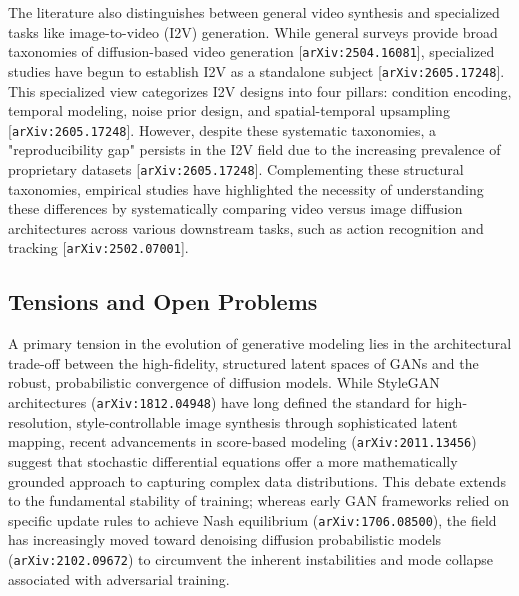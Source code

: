 \documentclass[11pt]{article}
\begin{document}
The literature also distinguishes between general video synthesis and specialized tasks like image-to-video (I2V) generation. While general surveys provide broad taxonomies of diffusion-based video generation [\texttt{arXiv:2504.16081}], specialized studies have begun to establish I2V as a standalone subject [\texttt{arXiv:2605.17248}]. This specialized view categorizes I2V designs into four pillars: condition encoding, temporal modeling, noise prior design, and spatial-temporal upsampling [\texttt{arXiv:2605.17248}]. However, despite these systematic taxonomies, a "reproducibility gap" persists in the I2V field due to the increasing prevalence of proprietary datasets [\texttt{arXiv:2605.17248}]. Complementing these structural taxonomies, empirical studies have highlighted the necessity of understanding these differences by systematically comparing video versus image diffusion architectures across various downstream tasks, such as action recognition and tracking [\texttt{arXiv:2502.07001}].

\subsection{Tensions and Open Problems}

A primary tension in the evolution of generative modeling lies in the architectural trade-off between the high-fidelity, structured latent spaces of GANs and the robust, probabilistic convergence of diffusion models. While StyleGAN architectures (\texttt{arXiv:1812.04948}) have long defined the standard for high-resolution, style-controllable image synthesis through sophisticated latent mapping, recent advancements in score-based modeling (\texttt{arXiv:2011.13456}) suggest that stochastic differential equations offer a more mathematically grounded approach to capturing complex data distributions. This debate extends to the fundamental stability of training; whereas early GAN frameworks relied on specific update rules to achieve Nash equilibrium (\texttt{arXiv:1706.08500}), the field has increasingly moved toward denoising diffusion probabilistic models (\texttt{arXiv:2102.09672}) to circumvent the inherent instabilities and mode collapse associated with adversarial training.
\end{document}
